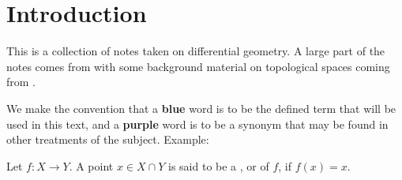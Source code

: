 \chapter*{Introduction}
This is a collection of notes taken on differential geometry. A large part of
the notes comes from \cite{lee2013smooth} with some background material on
topological spaces coming from \cite{munkres2000topology}.

We make the convention that a \textbf{\textcolor{jd_blue}{blue}} word is
to be the defined term that will be used in this text, and a
\textbf{\textcolor{jd_purple}{purple}} word is to be a synonym that may be found
in other treatments of the subject. Example:
\begin{define*}
    Let $f: X \to Y$. A point $x \in X \cap Y$ is said to be a
    , or  of $f$, if
    $f(x) = x$.
\end{define*}